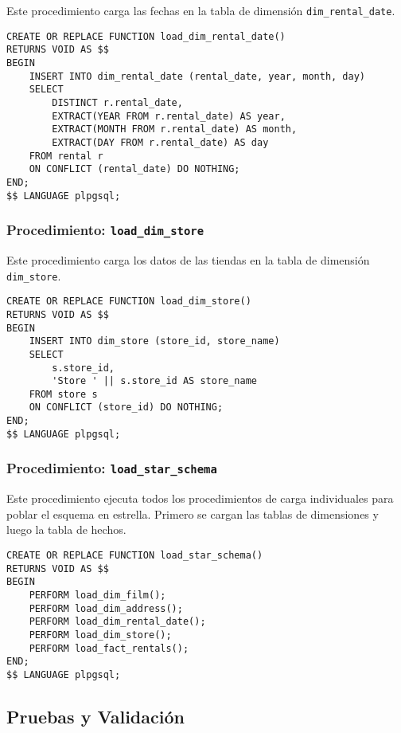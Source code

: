 \documentclass{article}
\begin{document}
Este procedimiento carga las fechas en la tabla de dimensión \texttt{dim\_rental\_date}.

\begin{lstlisting}
CREATE OR REPLACE FUNCTION load_dim_rental_date()
RETURNS VOID AS $$
BEGIN
    INSERT INTO dim_rental_date (rental_date, year, month, day)
    SELECT 
        DISTINCT r.rental_date,            
        EXTRACT(YEAR FROM r.rental_date) AS year,   
        EXTRACT(MONTH FROM r.rental_date) AS month,
        EXTRACT(DAY FROM r.rental_date) AS day
    FROM rental r
    ON CONFLICT (rental_date) DO NOTHING;
END;
$$ LANGUAGE plpgsql;
\end{lstlisting}

\subsubsection{Procedimiento: \texttt{load\_dim\_store}}

Este procedimiento carga los datos de las tiendas en la tabla de dimensión \texttt{dim\_store}.

\begin{lstlisting}
CREATE OR REPLACE FUNCTION load_dim_store()
RETURNS VOID AS $$
BEGIN
    INSERT INTO dim_store (store_id, store_name)
    SELECT 
        s.store_id,                   
        'Store ' || s.store_id AS store_name
    FROM store s
    ON CONFLICT (store_id) DO NOTHING;
END;
$$ LANGUAGE plpgsql;
\end{lstlisting}

\subsubsection{Procedimiento: \texttt{load\_star\_schema}}

Este procedimiento ejecuta todos los procedimientos de carga individuales para poblar el esquema en estrella. Primero se cargan las tablas de dimensiones y luego la tabla de hechos.

\begin{lstlisting}
CREATE OR REPLACE FUNCTION load_star_schema()
RETURNS VOID AS $$
BEGIN
    PERFORM load_dim_film();
    PERFORM load_dim_address();
    PERFORM load_dim_rental_date();
    PERFORM load_dim_store();
    PERFORM load_fact_rentals();
END;
$$ LANGUAGE plpgsql;
\end{lstlisting}

\newpage
\subsection{Pruebas y Validación}
\end{document}
